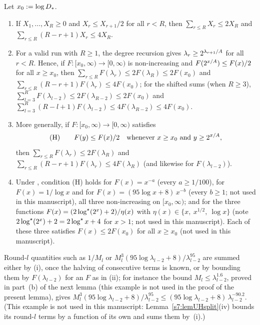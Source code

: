 \begin{lemma}\label{s2:lemLacunary}
Let $x_0\mathrel{:=}\log D_{*}$.
\begin{enumerate}
\item[(i)] If $X_1,\dots,X_R\ge0$ and $X_r\le X_{r+1}/2$ for all $r<R$, then
$\sum_{r\le R}X_r\le2X_R$ and $\sum_{r\le R}(R-r+1)X_r\le4X_R$.
\item[(ii)] For a valid run with $R\ge1$, the degree recursion gives
$\lambda_r\ge2^{\lambda_{r+1}/A}$ for all $r<R$. Hence, if
$F:[x_0,\infty)\to[0,\infty)$ is non-increasing and $F(2^{x/A})\le F(x)/2$
for all $x\ge x_0$, then $\sum_{r\le R}F(\lambda_r)\le2F(\lambda_R)\le
2F(x_0)$ and $\sum_{r\le R}(R-r+1)F(\lambda_r)\le4F(x_0)$; for the shifted
sums (when $R\ge3$), $\sum_{l=3}^RF(\lambda_{l-2})\le2F(\lambda_{R-2})\le2F(x_0)$
and $\sum_{l=3}^R(R-l+1)F(\lambda_{l-2})\le4F(\lambda_{R-2})\le4F(x_0)$.
\item[(iii)] More generally, if $F:[x_0,\infty)\to[0,\infty)$ satisfies
\[
\text{(H)}\qquad F(y)\le F(x)/2\quad\text{whenever } x\ge x_0\text{ and }
y\ge2^{x/A},
\]
then $\sum_{r\le R}F(\lambda_r)\le2F(\lambda_R)$ and $\sum_{r\le
R}(R-r+1)F(\lambda_r)\le4F(\lambda_R)$ (and likewise for $F(\lambda_{l-2})$).
\item[(iv)] Under , condition (H) holds for $F(x)=x^{-a}$ (every $a\ge
1/100$), for $F(x)=1/\log x$ and for $F(x)=(95\log x+8)\,x^{-b}$ (every $b\ge
1$; not used in this manuscript), all three non-increasing on $[x_0,\infty)$;
and for the three
functions $F(x)=(2\log^{\star}(2^x)+2)/\eta(x)$ with $\eta(x)\in\{x,\ x^{1/2},\
\log x\}$ (note $2\log^{\star}(2^x)+2=2\log^{\star} x+4$ for $x>1$; not used in this
manuscript). Each of these three
satisfies $F(x)\le2F(x_0)$ for all $x\ge x_0$ (not used in this manuscript).
\end{enumerate}
Round-$l$ quantities such as $1/M_l$ or
$M_l^3(95\log\lambda_{l-2}+8)/\lambda_{l-2}^{95}$ are summed either by (i),
once the halving of consecutive terms is known, or by bounding them by
$F(\lambda_{l-2})$ for an $F$ as in (ii); for instance the bound
$M_l\le\lambda_{l-2}^{1.6}$, proved in part~(b) of the next lemma (this
example is not used in the proof of the present lemma), gives
$M_l^3(95\log\lambda_{l-2}+8)/\lambda_{l-2}^{95}\le(95\log\lambda_{l-2}+8)\,
\lambda_{l-2}^{-90.2}$. (This example is not used in this manuscript:
Lemma~\ref{s7:lemUHsplit}(iv) bounds its round-$l$ terms by a function of its
own and sums them by~(i).)
\deps{\ref{s2:propDegRec}, \ref{s1:condG1}}
\end{lemma}

